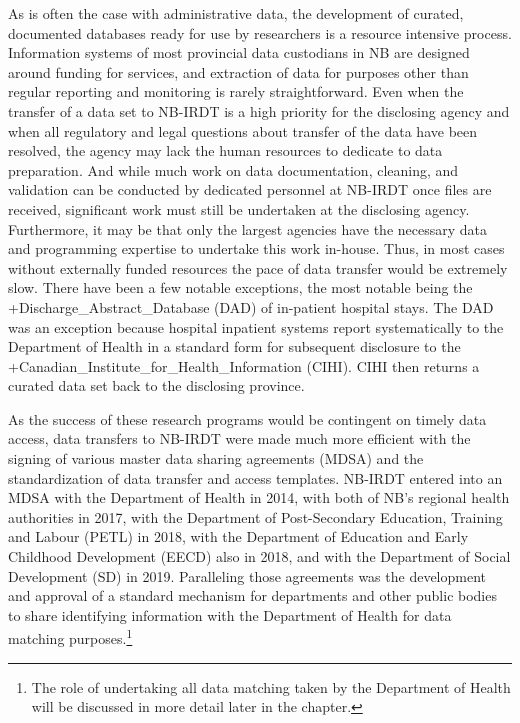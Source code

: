 \documentclass[
]{book}
\begin{document}
As is often the case with administrative data, the development of curated, documented databases ready for use by researchers is a resource intensive process. Information systems of most provincial data custodians in NB are designed around funding for services, and extraction of data for purposes other than regular reporting and monitoring is rarely straightforward. Even when the transfer of a data set to NB-IRDT is a high priority for the disclosing agency and when all regulatory and legal questions about transfer of the data have been resolved, the agency may lack the human resources to dedicate to data preparation. And while much work on data documentation, cleaning, and validation can be conducted by dedicated personnel at NB-IRDT once files are received, significant work must still be undertaken at the disclosing agency. Furthermore, it may be that only the largest agencies have the necessary data and programming expertise to undertake this work in-house. Thus, in most cases without externally funded resources the pace of data transfer would be extremely slow. There have been a few notable exceptions, the most notable being the +Discharge\_Abstract\_Database\textbar{} (DAD) of in-patient hospital stays. The DAD was an exception because hospital inpatient systems report systematically to the Department of Health in a standard form for subsequent disclosure to the +Canadian\_Institute\_for\_Health\_Information\textbar{} (CIHI). CIHI then returns a curated data set back to the disclosing province.

As the success of these research programs would be contingent on timely data access, data transfers to NB-IRDT were made much more efficient with the signing of various master data sharing agreements (MDSA) and the standardization of data transfer and access templates. NB-IRDT entered into an MDSA with the Department of Health in 2014, with both of NB's regional health authorities in 2017, with the Department of Post-Secondary Education, Training and Labour (PETL) in 2018, with the Department of Education and Early Childhood Development (EECD) also in 2018, and with the Department of Social Development (SD) in 2019. Paralleling those agreements was the development and approval of a standard mechanism for departments and other public bodies to share identifying information with the Department of Health for data matching purposes.\footnote{The role of undertaking all data matching taken by the Department of Health will be discussed in more detail later in the chapter.}
\end{document}
